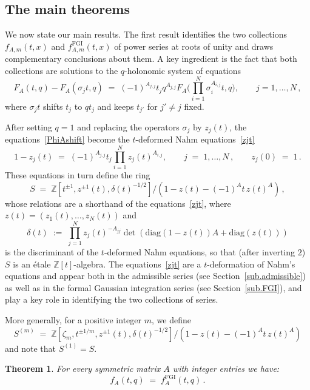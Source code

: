 \documentclass[12pt,reqno]{amsart}
\newcounter{theoremcount}
\newtheorem{theorem}[theoremcount]{Theorem}
\theoremstyle{definition}
\def\BZ{\mathbb Z}
\def\s{\sigma}
\def\be{\begin{equation}}
\def\ee{\end{equation}}
\def\z{\zeta}
\def\={\;=\;}
\def\FGI{\mathrm{FGI}}
\def\Phitof{f}
\begin{document}
\subsection{The main theorems}
\label{sub.results}

We now state our main results. The first result identifies the two collections
$\Phitof_{A,m}(t,x)$ and $\Phitof^\FGI_{A,m}(t,x)$ of power series at roots of unity and
draws complementary conclusions about them. A key ingredient is the fact that
both collections are solutions to the $q$-holonomic system of equations
\be
\label{PhiAshift}
F_A(t,q) - F_A(\s_jt,q) \= (-1)^{A_{j,j}} t_{j} q^{A_{j,j}}
F_A\Big(\prod_{i=1}^N \s_i^{A_{i,j}}t,q\Big), \qquad j=1,\dots,N\,,
\ee
where $\s_jt$ shifts $t_j$ to $q t_j$ and keeps $t_{j'}$ for $j' \neq j$ fixed.

After setting $q=1$ and replacing the operators $\s_j$ by $z_j(t)$, the
equations~\eqref{PhiAshift} become the $t$-deformed Nahm equations~\eqref{zjt}
\be
\label{zjt}
1-z_j(t) \= (-1)^{A_{j,j}} t_j \prod_{i=1}^N z_j(t)^{A_{i,j}},
\qquad j\=1,\dots,N\,,\qquad
z_j(0)\=1\,.
\ee
These equations in turn define the ring 
\be
\label{Sdef}
S\= \BZ[t^{\pm 1}, z^{\pm 1}(t), \delta(t)^{-1/2}]\big/
(1-z(t)-(-1)^A t \,z(t)^A)\,,
\ee
whose relations are a shorthand of the equations~\eqref{zjt},
where $z(t)=(z_1(t),\dots,z_N(t))$ and
\be
\label{taulambda}
\delta(t)\;:=\;\prod_{j=1}^Nz_j(t)^{-A_{jj}} \det(\mathrm{diag}(1-z(t)) A +
\mathrm{diag}(z(t)))
\ee
is the discriminant of the $t$-deformed Nahm equations, so that (after inverting $2$)
$S$ is an \'etale $\BZ[t]$-algebra.
The equations~\eqref{zjt} are a $t$-deformation of Nahm's equations and appear
both in the admissible series (see Section~\ref{sub.admissible}) as well as in
the formal Gaussian integration series (see Section~\ref{sub.FGI}), and
play a key role in identifying the two collections of series. 

More generally, for a positive integer $m$, we define
\be
\label{RA}
S^{(m)}\=
\BZ[\z_m,t^{\pm 1/m}, z^{\pm 1}(t),\delta(t)^{-1/2}]\big/
(1-z(t)-(-1)^A t \,z(t)^A)
\ee
and note that $S^{(1)}=S$.

\begin{theorem}
\label{thm.1}
For every symmetric matrix $A$ with integer entries we have:
\be
\label{eq.thm1}
\Phitof_{A}(t,q) \= \Phitof_{A}^\FGI(t,q)\,.
\ee
\end{theorem}
\end{document}
